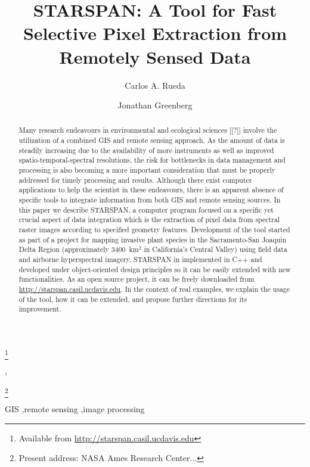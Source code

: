 \documentclass{elsart}
\begin{document}
\begin{frontmatter}

\title{STARSPAN: 
A Tool for Fast Selective Pixel Extraction 
from Remotely Sensed Data}
\thanks[label1]{Available from \url{http://starspan.casil.ucdavis.edu}}

\author{Carlos A. Rueda},
\author{Jonathan Greenberg}
\thanks[greenberg]{Present address: NASA Ames Research Center...}

\address{Center for Spatial Technologies and Remote Sensing (CSTARS).
The Barn. University of California, Davis. One Shields Avenue, Davis, CA 95616}

\begin{abstract}
	
	Many research endeavours in environmental and ecological sciences [[?]]
	involve the utilization of a combined GIS and remote sensing approach. As
	the amount of data is steadily increasing due to the availability of more
	instruments as well as improved spatio-temporal-spectral resolutions, the
	risk for bottlenecks in data management and processing is also becoming a
	more important consideration that must be properly addressed for timely
	processing and results. Although there exist computer applications to help
	the scientist in these endeavours, there is an apparent absence of specific
	tools to integrate information from both GIS and remote sensing sources. In
	this paper we describe STARSPAN, a computer program focused on a specific
	yet crucial aspect of data integration which is the extraction of pixel data
	from spectral raster images according to specified geometry features.
	Development of the tool started as part of a project for mapping invasive
	plant species in the Sacramento-San Joaquin Delta Region (approximately
	$3400$~km$^2$ in California's Central Valley) using field data and airborne
	hyperspectral imagery. STARSPAN in implemented in C++ and developed under
	object-oriented design principles so it can be easily extended with new
	functionalities. As an open source project, it can be freely downloaded from
	\url{http://starspan.casil.ucdavis.edu}. In the context of real examples, we
	explain the usage of the tool, how it can be extended, and propose further
	directions for its improvement.
	
	
\end{abstract}

\begin{keyword}
GIS \sep remote sensing \sep image processing
\end{keyword}

\end{frontmatter}
\end{document}
